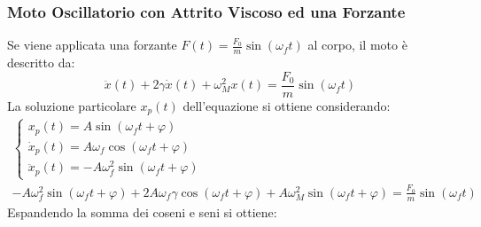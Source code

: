 \documentclass{article}
\numberwithin{equation}{subsection}
\begin{document}
\subsubsection{Moto Oscillatorio con Attrito Viscoso ed una Forzante}
Se viene applicata una forzante $F(t)=\displaystyle\frac{F_0}{m}\sin(\omega_f t)$ 
al corpo, il moto è descritto da: 
\begin{equation}
    \ddot x(t)+2\gamma\dot x(t)+\omega_M^{2}x(t)=\displaystyle\frac{F_0}{m}\sin(\omega_f t)
\end{equation}
La soluzione particolare $x_p(t)$ dell'equazione si ottiene considerando:
\begin{gather*}
    \begin{cases}
        x_p(t)=A\sin(\omega_f t+\varphi)\\
        \dot x_p(t)=A\omega_f\cos(\omega_f t+\varphi)\\
        \ddot x_p(t)=-A\omega_f^{2}\sin(\omega_f t+\varphi)
    \end{cases}\\
    -A\omega_f^{2}\sin(\omega_f t+\varphi)+
    2A\omega_f\gamma \cos(\omega_f t+\varphi)+
    A\omega_M^{2}\sin(\omega_f t+\varphi)=\displaystyle\frac{F_0}{m}\sin(\omega_f t)
\end{gather*}
Espandendo la somma dei coseni e seni si ottiene: 
\end{document}

